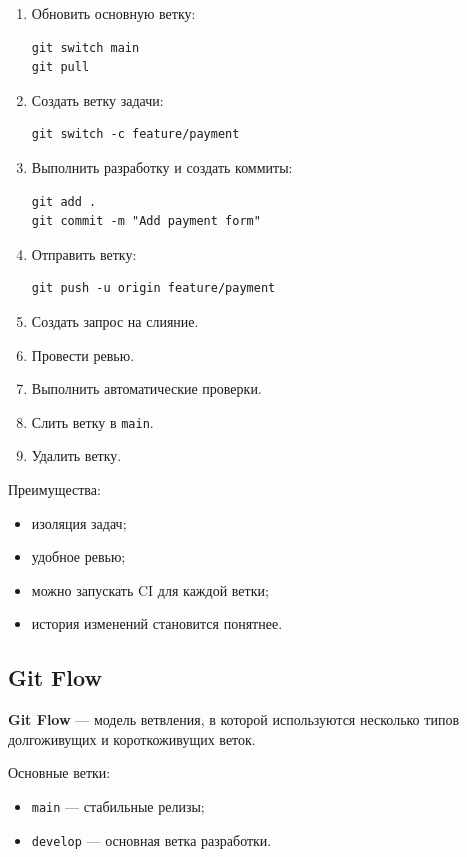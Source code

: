 \documentclass[12pt,a4paper]{article}
\begin{document}
\begin{enumerate}
    \item Обновить основную ветку:
\begin{lstlisting}
git switch main
git pull
\end{lstlisting}

    \item Создать ветку задачи:
\begin{lstlisting}
git switch -c feature/payment
\end{lstlisting}

    \item Выполнить разработку и создать коммиты:
\begin{lstlisting}
git add .
git commit -m "Add payment form"
\end{lstlisting}

    \item Отправить ветку:
\begin{lstlisting}
git push -u origin feature/payment
\end{lstlisting}

    \item Создать запрос на слияние.
    \item Провести ревью.
    \item Выполнить автоматические проверки.
    \item Слить ветку в \texttt{main}.
    \item Удалить ветку.
\end{enumerate}

Преимущества:

\begin{itemize}
    \item изоляция задач;
    \item удобное ревью;
    \item можно запускать CI для каждой ветки;
    \item история изменений становится понятнее.
\end{itemize}

\subsection{Git Flow}

\textbf{Git Flow} --- модель ветвления, в которой используются несколько типов долгоживущих и короткоживущих веток.

Основные ветки:

\begin{itemize}
    \item \texttt{main} --- стабильные релизы;
    \item \texttt{develop} --- основная ветка разработки.
\end{itemize}
\end{document}

